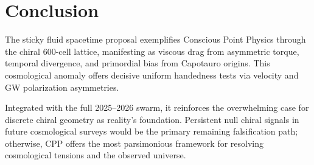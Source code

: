 \documentclass[11pt]{article}
\begin{document}
\section{Conclusion}
The sticky fluid spacetime proposal exemplifies Conscious Point Physics through the chiral 600-cell lattice, manifesting as viscous drag from asymmetric torque, temporal divergence, and primordial bias from Capotauro origins. This cosmological anomaly offers decisive uniform handedness tests via velocity and GW polarization asymmetries.  

Integrated with the full 2025--2026 swarm, it reinforces the overwhelming case for discrete chiral geometry as reality's foundation. Persistent null chiral signals in future cosmological surveys would be the primary remaining falsification path; otherwise, CPP offers the most parsimonious framework for resolving cosmological tensions and the observed universe.
\end{document}
